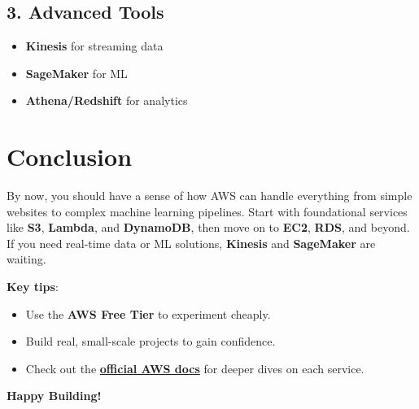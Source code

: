 \documentclass[12pt]{article}
\begin{document}
\subsection{3. Advanced Tools}
\begin{itemize}
    \item \textbf{Kinesis} for streaming data
    \item \textbf{SageMaker} for ML
    \item \textbf{Athena/Redshift} for analytics
\end{itemize}

\begin{center}
\end{center}

\clearpage

\section*{Conclusion}
\justifying

By now, you should have a sense of how AWS can handle everything from simple websites to complex machine learning pipelines. Start with foundational services like \textbf{S3}, \textbf{Lambda}, and \textbf{DynamoDB}, then move on to \textbf{EC2}, \textbf{RDS}, and beyond. If you need real-time data or ML solutions, \textbf{Kinesis} and \textbf{SageMaker} are waiting.

\textbf{Key tips}:
\begin{itemize}
    \item Use the \textbf{AWS Free Tier} to experiment cheaply.
    \item Build real, small-scale projects to gain confidence.
    \item Check out the
          \href{https://aws.amazon.com/documentation/}{\textbf{official AWS docs}}
          for deeper dives on each service.
\end{itemize}

\textbf{Happy Building!}
\end{document}
